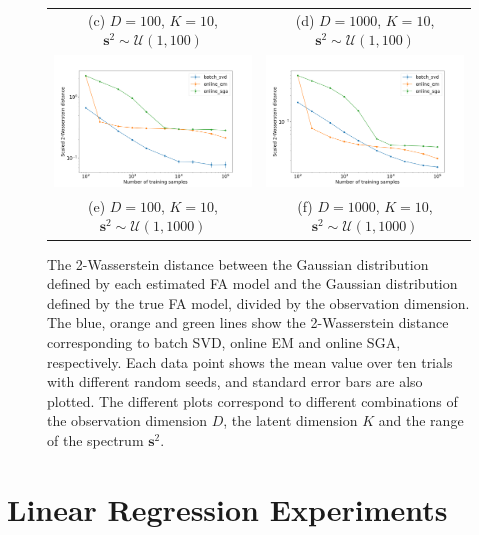 \documentclass[msc,deptreport.inf]{infthesis} %
\newcommand{\matr}[1]{\mathbf{#1}}
\begin{document}
\begin{figure}[!htbp]
\begin{tabular}{cc}
		 (c) $D=100$, $K=10$, $\matr{s}^2 \sim \mathcal{U}(1, 100)$ 
		 & (d) $D=1000$, $K=10$, $\matr{s}^2 \sim \mathcal{U}(1, 100)$\\[6pt]
		 \includegraphics[width=70mm]{plots/online_fa_wasserstein__observation_dim=100__latent_dim=10__spectrum_min=1__spectrum_max=1000.png} 
		 & \includegraphics[width=70mm]{plots/online_fa_wasserstein__observation_dim=1000__latent_dim=10__spectrum_min=1__spectrum_max=1000.png} \\
		 (e) $D=100$, $K=10$, $\matr{s}^2 \sim \mathcal{U}(1, 1000)$ 
		 & (f) $D=1000$, $K=10$, $\matr{s}^2 \sim \mathcal{U}(1, 1000)$\\[6pt]
	\end{tabular}
	\caption{The 2-Wasserstein distance between the Gaussian distribution defined by each estimated FA model and the Gaussian distribution defined by the true FA model, divided by the observation dimension. The blue, orange and green lines show the 2-Wasserstein distance corresponding to batch SVD, online EM and online SGA, respectively. Each data point shows the mean value over ten trials with different random seeds, and standard error bars are also plotted. The different plots correspond to different combinations of the observation dimension $D$, the latent dimension $K$ and the range of the spectrum $\matr{s}^2$.}
	\label{fig:fa_wasserstein}
\end{figure}


\chapter{Linear Regression Experiments}\label{ch:linear_regression_experiments}
\end{document}
